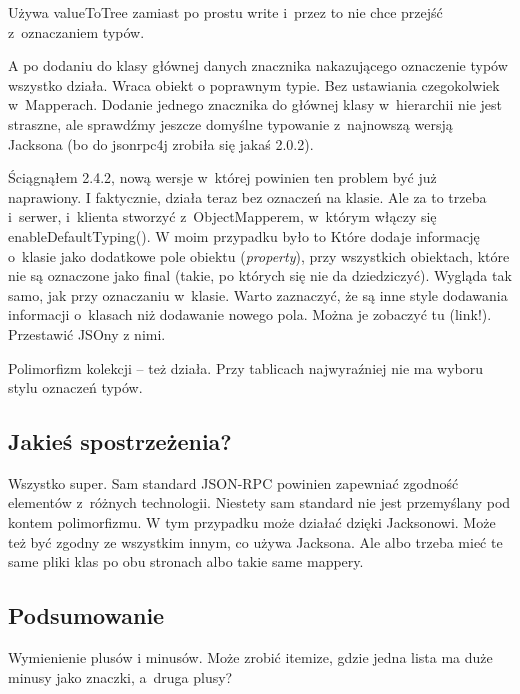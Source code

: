 Używa valueToTree zamiast po prostu write i~przez to nie chce przejść z~oznaczaniem typów.

A po dodaniu do klasy głównej danych znacznika nakazującego oznaczenie typów wszystko działa.
Wraca obiekt o poprawnym typie. Bez ustawiania czegokolwiek w~Mapperach.
Dodanie jednego znacznika do głównej klasy w~hierarchii nie jest straszne, ale sprawdźmy jeszcze domyślne typowanie z~najnowszą wersją Jacksona (bo do jsonrpc4j zrobiła się jakaś 2.0.2).

Ściągnąłem 2.4.2, nową wersje w~której powinien ten problem być już naprawiony. I faktycznie, działa teraz bez oznaczeń na klasie. Ale za to trzeba i~serwer, i~klienta stworzyć z~ObjectMapperem, w~którym włączy się enableDefaultTyping(). W moim przypadku było to
Które dodaje informację o~klasie jako dodatkowe pole obiektu (\emph{property}), przy wszystkich obiektach, które nie są oznaczone jako final (takie, po których się nie da dziedziczyć).
Wygląda tak samo, jak przy oznaczaniu w~klasie. Warto zaznaczyć, że są inne style dodawania informacji o~klasach niż dodawanie nowego pola. Można je zobaczyć tu (link!). Przestawić JSOny z nimi.

Polimorfizm kolekcji -- też działa. Przy tablicach najwyraźniej nie ma wyboru stylu oznaczeń typów.


\subsection{Jakieś spostrzeżenia?}
Wszystko super. Sam standard JSON-RPC powinien zapewniać zgodność elementów z~różnych technologii. Niestety sam standard nie jest przemyślany pod kontem polimorfizmu. W tym przypadku może działać dzięki Jacksonowi.
Może też być zgodny ze wszystkim innym, co używa Jacksona. Ale albo trzeba mieć te same pliki klas po obu stronach albo takie same mappery.

\subsection{Podsumowanie}
Wymienienie plusów i minusów. Może zrobić itemize, gdzie jedna lista ma duże minusy jako znaczki, a~druga plusy?



